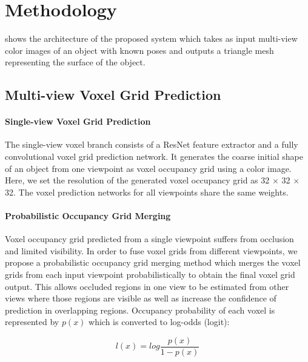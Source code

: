 \section{Methodology}

 shows the architecture of the proposed system which takes as input multi-view color images of an object with known poses and outputs a triangle mesh representing the surface of the object.

\subsection{Multi-view Voxel Grid Prediction}
\label{subsec:multiview_voxel}

\paragraph{Single-view Voxel Grid Prediction}
The single-view voxel branch consists of a ResNet feature extractor and a fully convolutional voxel grid prediction network. It generates the coarse initial shape of an object from one viewpoint as voxel occupancy grid using a color image. Here, we set the resolution of the generated voxel occupancy grid as 32 $\times$ 32 $\times$ 32. The voxel prediction networks for all viewpoints share the same weights.
\vspace{-4mm}
\paragraph{Probabilistic Occupancy Grid Merging}
Voxel occupancy grid predicted from a single viewpoint suffers from occlusion and limited visibility. In order to fuse voxel grids from different viewpoints, we propose a probabilistic occupancy grid merging method which merges the voxel grids from each input viewpoint probabilistically to obtain the final voxel grid output. This allows occluded regions in one view to be estimated from other views where those regions are visible as well as increase the confidence of prediction in overlapping regions.
Occupancy probability of each voxel is represented by $p(x)$ which is converted to log-odds (logit):

\begin{equation}
    l(x) = log \frac{p(x)}{1 - p(x)}
    \label{equ:logodds}
\end{equation}


